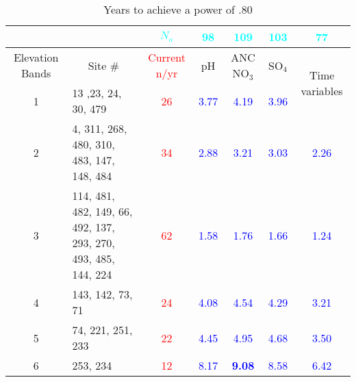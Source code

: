 \begin{table}\scriptsize
\caption{Years to achieve a power of .80}
\begin{tabular}{clccccc}
&&\textcolor{cyan}{$N_a$}&\textcolor{cyan}{98}&\textcolor{cyan}{109}&\textcolor{cyan}{103}&\textcolor{cyan}{77}\\
\toprule
\multicolumn{1}{p{.5cm}}{Elevation Bands} & \multicolumn{1}{c}{Site \#} & \multicolumn{1}{p{.5cm}}{\textcolor{red}{Current n/yr}} & \multicolumn{1}{p{.5cm}}{pH} &\multicolumn{1}{p{.5cm}}{ ANC NO$_3$} & SO$_4$ & \multirow{2}{.8cm}{Time variables} \\  
\midrule
1 & 13 ,23, 24, 30, 479 & \textcolor{red}{26} & \textcolor{blue}{3.77}  & \textcolor{blue}{4.19}  & \textcolor{blue}{3.96}  & \textcolor{blue}{2.96}  \\ 
2 & \multicolumn{1}{p{4cm}}{4, 311, 268, 480, 310, 483, 147, 148, 484} & \textcolor{red}{34} & \textcolor{blue}{2.88}  & \textcolor{blue}{3.21}  & \textcolor{blue}{3.03}  & \textcolor{blue}{2.26}  \\ 
3 & \multicolumn{ 1}{p{4cm}}{114, 481, 482, 149, 66, 492, 137, 293, 270, 493, 485, 144, 224} & \multicolumn{ 1}{c}{\textcolor{red}{62}} & \multicolumn{ 1}{c}{\textcolor{blue}{1.58}} & \multicolumn{ 1}{c}{\textcolor{blue}{1.76}} & \multicolumn{ 1}{c}{\textcolor{blue}{1.66}} & \multicolumn{ 1}{c}{\textcolor{blue}{1.24}} \\ 
4 & 143, 142, 73, 71 & \textcolor{red}{24} & \textcolor{blue}{4.08}  & \textcolor{blue}{4.54}  & \textcolor{blue}{4.29}  & \textcolor{blue}{3.21}  \\ 
5 & 74, 221, 251, 233 & \textcolor{red}{22} & \textcolor{blue}{4.45}  & \textcolor{blue}{4.95}  & \textcolor{blue}{4.68}  & \textcolor{blue}{3.50}  \\ 
6 & 253, 234 & \textcolor{red}{12} & \textcolor{blue}{8.17}  & \textcolor{blue}{\textbf{9.08}}  & \textcolor{blue}{8.58}  & \textcolor{blue}{6.42}  \\  
\bottomrule
\end{tabular}
\end{table}